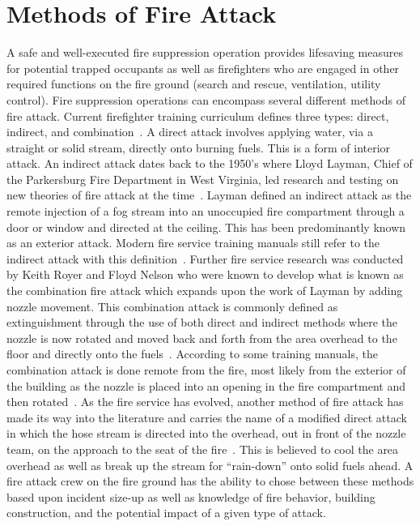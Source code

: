 \documentclass[12pt,oneside]{book}
\begin{document}
\section*{Methods of Fire Attack}

A safe and well-executed fire suppression operation provides lifesaving measures for potential trapped occupants as well as firefighters who are engaged in other required functions on the fire ground (search and rescue, ventilation, utility control). Fire suppression operations can encompass several different methods of fire attack. Current firefighter training curriculum defines three types: direct, indirect, and combination~\cite{Essentials6}. A direct attack involves applying water, via a straight or solid stream, directly onto burning fuels. This is a form of interior attack. An indirect attack dates back to the 1950's where Lloyd Layman, Chief of the Parkersburg Fire Department in West Virginia, led research and testing on new theories of fire attack at the time~\cite{ExtinguishingFires, FirefightingTactics}. Layman defined an indirect attack as the remote injection of a fog stream into an unoccupied fire compartment through a door or window and directed at the ceiling. This has been predominantly known as an exterior attack. Modern fire service training manuals still refer to the indirect attack with this definition~\cite{Essentials6,FEHandbook}. Further fire service research was conducted by Keith Royer and Floyd Nelson who were known to develop what is known as the combination fire attack which expands upon the work of Layman by adding nozzle movement. This combination attack is commonly defined as extinguishment through the use of both direct and indirect methods where the nozzle is now rotated and moved back and forth from the area overhead to the floor and directly onto the fuels~\cite{Essentials6}. According to some training manuals, the combination attack is done remote from the fire, most likely from the exterior of the building as the nozzle is placed into an opening in the fire compartment and then rotated~\cite{FEHandbook}. As the fire service has evolved, another method of fire attack has made its way into the literature and carries the name of a modified direct attack in which the hose stream is directed into the overhead, out in front of the nozzle team, on the approach to the seat of the fire~\cite{FEHandbook}. This is believed to cool the area overhead as well as break up the stream for ``rain-down'' onto solid fuels ahead. A fire attack crew on the fire ground has the ability to chose between these methods based upon incident size-up as well as knowledge of fire behavior, building construction, and the potential impact of a given type of attack.
\end{document}
